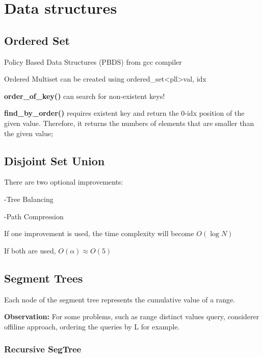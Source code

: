 \chapter{Data structures}

\section{Ordered Set}

    Policy Based Data Structures (PBDS) from gcc compiler

    Ordered Multiset can be created using ordered\_set\textless pll\textgreater {val, idx}

    \textbf{order\_of\_key()} can search for non-existent keys!
    
    \textbf{find\_by\_order()} requires existent key and return the 0-idx position of the given value.
    Therefore, it returns the numbers of elements that are smaller than the given value;


\section{Disjoint Set Union}

    There are two optional improvements:

        -Tree Balancing 
        
        -Path Compression

    If one improvement is used, 
    the time complexity will become $O(\log{N})$

    If both are used, $O(\alpha) \approx O(5)$


\section{Segment Trees}

    Each node of the segment tree represents the cumulative value of a range.

    \textbf{Observation:} For some problems, such as range distinct values query,
    considerer offiline approach, ordering the queries by L for example. 

    \subsection{Recursive SegTree}


